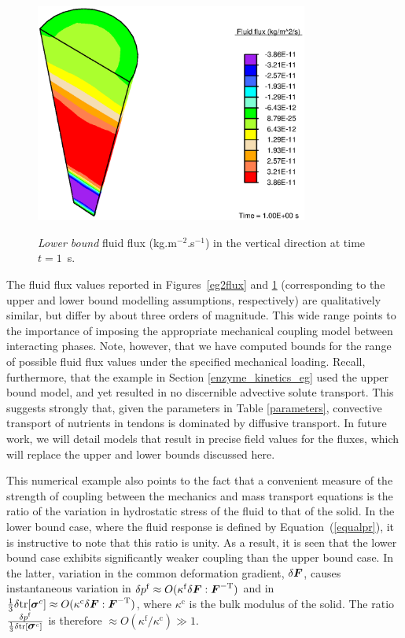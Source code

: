 \begin{figure}[!hpt]
  \centering
      {\includegraphics[width=0.8\textwidth]{images/examples/lagrangian/constriction/lower-bound-flux}}
      \caption{{\em Lower bound} fluid flux (kg.m$^{-2}$.s$^{-1}$) in
        the vertical direction at time $t=1$~s.}
      \label{lowerbound}
\end{figure}

The fluid flux values reported in Figures~\ref{eg2flux} and
\ref{lowerbound} (corresponding to the upper and lower bound modelling
assumptions, respectively) are qualitatively similar, but differ by
about three orders of magnitude. This wide range points to the
importance of imposing the appropriate mechanical coupling model
between interacting phases. Note, however, that we have computed
bounds for the 
range of possible fluid flux values under the specified mechanical
loading. Recall, furthermore, that the example in Section
\ref{enzyme_kinetics_eg} used the upper bound model, and yet resulted
in no discernible advective solute transport. This suggests strongly
that, given the parameters in Table \ref{parameters}, convective
transport of nutrients in tendons is dominated by diffusive
transport. In future work, we will detail models that result in precise
field values for the fluxes, which will replace the upper and lower
bounds discussed here.  


This numerical example also points to the fact that a convenient
measure of the strength of 
coupling between the mechanics and mass transport equations is the
ratio of the variation in hydrostatic stress of the fluid to that of
the solid. In the lower bound case, where the fluid response is
defined by Equation~(\ref{equalpr}), it is instructive to note that
this ratio is unity. As a result, it is seen that the lower bound case
exhibits significantly weaker coupling than the upper bound case. In
the latter, variation in the common deformation gradient, $\delta
\mbox{\boldmath$ F$}$, causes instantaneous variation in \mbox{$\delta p^{\mathrm{f}} \approx
  O(\kappa^{\mathrm{f}} \delta \mbox{\boldmath$ F$}:\mbox{\boldmath$ F$}^{-\mathrm{T}})$} and in
\mbox{$\frac{1}{3} \delta\mathrm{\small{tr}}[\mbox{\boldmath$\sigma$}^{c}] \approx
  O(\kappa^{\mathrm{c}} \delta \mbox{\boldmath$ F$}:\mbox{\boldmath$ F$}^{-\mathrm{T}})$}, where
$\kappa^{\mathrm{c}}$ is the bulk modulus of the solid. The ratio
$\frac{\delta p^{\mathrm{f}}}{\frac{1}{3} \delta
  \mathrm{\small{tr}}[\mbox{\boldmath$\sigma$}^{c}]}$ is therefore \mbox{$\approx
O(\kappa^{\mathrm{f}}/\kappa^{\mathrm{c}}) \gg 1$}.

